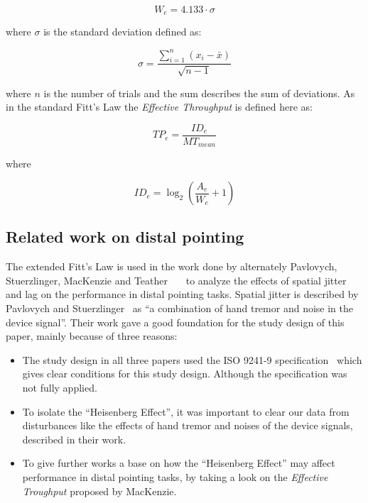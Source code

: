 \[ W_e = 4.133 \cdot \sigma \]

where $\sigma$ is the standard deviation defined as:

\[ \sigma = \frac{\sum_{i=1}^{n} (x_i - \bar{x}) }{\sqrt{n - 1}}  \]

where $n$ is the number of trials and the sum describes the sum of deviations. As in the standard Fitt's Law the \textit{Effective Throughput} is defined here as:

\[ TP_e = \frac{ID_e}{MT_{mean}} \]

where 

\[ ID_e = \log_2 (\frac{A_e}{W_e} + 1) \]

\subsection{Related work on distal pointing}
\label{subsec:related-work:background:realted_work_on_distal_pointing}

The extended Fitt's Law is used in the work done by alternately Pavlovych, Stuerzlinger, MacKenzie and Teather~\cite{pavlovych_tradeoff_2009}~\cite{teather_effects_2009}~\cite{teather_pointing_2011} to analyze the effects of spatial jitter and lag on the performance in distal pointing tasks. Spatial jitter is described by Pavlovych and Stuerzlinger~\cite{pavlovych_tradeoff_2009} as ``a combination of hand tremor and noise in the device signal''. Their work gave a good foundation for the study design of this paper, mainly because of three reasons:

\begin{itemize}
    \item The study design in all three papers used the ISO 9241-9 specification~\cite{douglas_testing_1999} which gives clear conditions for this study design. Although the specification was not fully applied.
    \item To isolate the ``Heisenberg Effect'', it was important to clear our data from disturbances like the effects of hand tremor and noises of the device signals, described in their work.
    \item To give further works a base on how the ``Heisenberg Effect'' may affect performance in distal pointing tasks, by taking a look on the \textit{Effective Troughput} proposed by MacKenzie.
\end{itemize}




